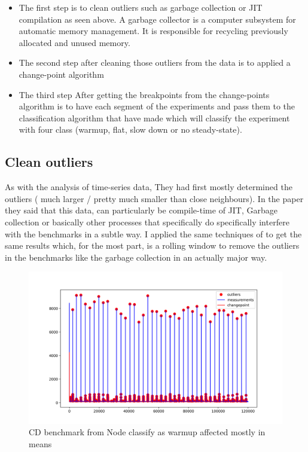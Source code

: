 \documentclass{article}
\begin{document}
\begin{itemize}
    \item The first step is to clean outliers such as garbage collection or JIT compilation as seen above. A garbage collector is a computer subsystem for automatic memory management.  It is responsible for recycling previously allocated and unused memory.  
    \item The second step after cleaning those outliers from the data is to applied a change-point algorithm \cite{killick2014changepoint}
    \item The third step After getting the breakpoints from the change-points algorithm is to have each segment of the experiments and pass them to the classification algorithm that \cite{barrett2017virtual} have made which will classify the experiment with four class (warmup, flat, slow down or no steady-state).
\end{itemize}




\subsection{Clean outliers}

As with the analysis of time-series data, They had first mostly determined the outliers ( much larger / pretty much smaller than close neighbours). In the paper \cite{barrett2017virtual} they said that this data, can particularly be compile-time of JIT, Garbage collection or basically other processes that specifically do specifically interfere with the benchmarks in a subtle way. I applied the same techniques of \cite{barrett2017virtual} to get the same results which, for the most part, is a rolling window to remove the outliers in the benchmarks like the garbage collection in an actually major way.

\begin{figure}[h!]
    \centering
    \includegraphics[width=1\textwidth]{images/plot_13_flat.png}
    \caption{CD benchmark from Node classify as warmup affected mostly in means}
    \label{fig:bench_node_flat}
\end{figure}
\end{document}
